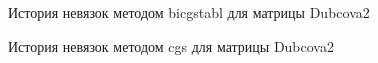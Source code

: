 \begin{figure}
    \renewcommand{\figurename}{Рисунок}
    \caption{История невязок методом bicgstabl для матрицы Dubcova2}
    \label{fig:image}
\end{figure}

\begin{figure}
    \renewcommand{\figurename}{Рисунок}
    \caption{История невязок методом cgs для матрицы Dubcova2}
    \label{fig:image}
\end{figure}

